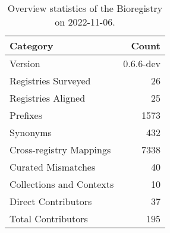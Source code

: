 \begin{table}
\centering
\caption{Overview statistics of the Bioregistry on 2022-11-06.}
\label{tab:bioregistry-summary}
\begin{tabular}{lr}
\toprule
                Category &     Count \\
\midrule
                 Version & 0.6.6-dev \\
     Registries Surveyed &        26 \\
      Registries Aligned &        25 \\
                Prefixes &      1573 \\
                Synonyms &       432 \\
 Cross-registry Mappings &      7338 \\
      Curated Mismatches &        40 \\
Collections and Contexts &        10 \\
     Direct Contributors &        37 \\
      Total Contributors &       195 \\
\bottomrule
\end{tabular}
\end{table}

